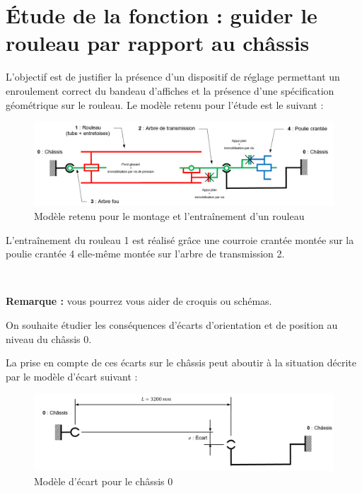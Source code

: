 \section{Étude de la fonction : \og guider le rouleau par rapport au châssis \fg}
 
L'objectif est de justifier la présence d'un dispositif de réglage permettant un enroulement correct du bandeau d'affiches et la présence d'une spécification géométrique sur le rouleau.
Le modèle retenu pour l'étude est le suivant :

\begin{figure}[!h]
\begin{center}
	\includegraphics[width=0.9\linewidth]{img/fig22}
\end{center}
\caption{Modèle retenu pour le montage et l'entraînement d'un rouleau}
\label{fig22}
\end{figure}

L'entraînement du rouleau 1 est réalisé grâce une courroie crantée montée sur la poulie crantée 4 elle-même montée sur l'arbre de transmission 2.



~\

\textbf{Remarque :} vous pourrez vous aider de croquis ou schémas.

\newpage

On souhaite étudier les conséquences d'écarts d'orientation et de position au niveau du châssis 0.

La prise en compte de ces écarts sur le châssis peut aboutir à la situation décrite par le modèle d'écart suivant :

\begin{figure}[!h]
\begin{center}
	\includegraphics[width=0.6\linewidth]{img/fig23}
\end{center}
\caption{Modèle d'écart pour le châssis 0}
\label{fig23}
\end{figure}

